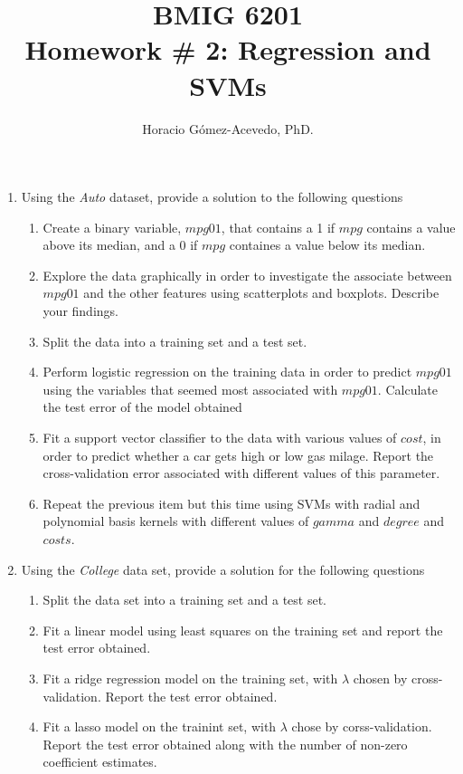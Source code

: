 \documentclass[]{article}
\title{BMIG 6201\\
Homework \# 2: Regression and SVMs}
\author{Horacio G\'omez-Acevedo, PhD.}
\begin{document}
\maketitle

\begin{enumerate}
	\item Using the {\it Auto} dataset, provide a solution to the following questions
	\begin{enumerate}
		\item Create a binary variable, $mpg01$, that contains a 1 if $mpg$ contains a value above its median, and a 0 if $mpg$ containes a value below its median. 
		\item Explore the data graphically in order to investigate the associate between $mpg01$ and the other features using scatterplots and boxplots. Describe your findings.
		\item Split the data into a training set and a test set. 
		\item Perform logistic regression on the training data in order to predict $mpg01$ using the variables that seemed most associated with $mpg01$. Calculate the test error of the model obtained
		\item Fit a support vector classifier to the data with various values of $cost$, in order to predict whether a car gets high or low gas milage. Report the cross-validation error associated with different values of this parameter.
		\item Repeat the previous item but this time using SVMs with radial and polynomial basis kernels with different values of $gamma$ and $degree$ and $costs$. 
	
	\end{enumerate}
	\item Using the {\it College} data set, provide a solution for the following questions
	\begin{enumerate}
		\item Split the data set into a training set and a test set.
		\item Fit a linear model using least squares on the training set and report the test error obtained.
		\item Fit a ridge regression model on the training set, with $\lambda$ chosen by cross-validation. Report the test error obtained.
		\item Fit a lasso model on the trainint set, with $\lambda$ chose by corss-validation. Report the test error obtained along with the number of non-zero coefficient estimates.
		
	\end{enumerate}
\end{enumerate}
\end{document}

